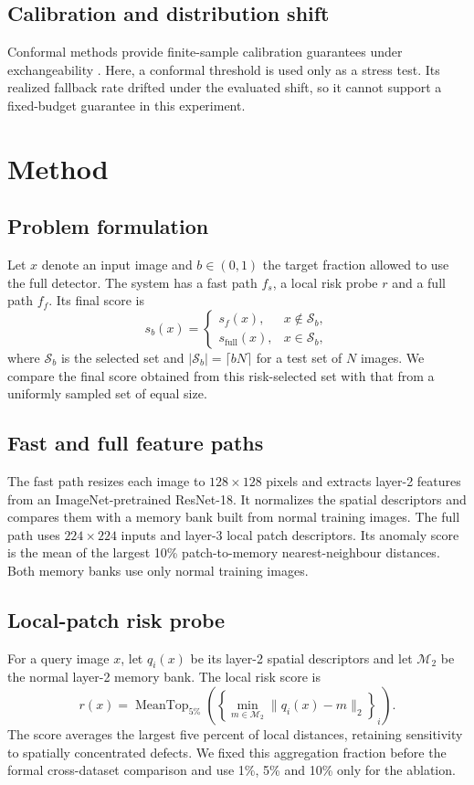 \documentclass[iicol,pdflatex,sn-basic,Numbered]{sn-jnl}
\begin{document}
\subsection{Calibration and distribution shift}
Conformal methods provide finite-sample calibration guarantees under exchangeability \cite{vovk2005algorithmic,angelopoulos2023conformal}. Here, a conformal threshold is used only as a stress test. Its realized fallback rate drifted under the evaluated shift, so it cannot support a fixed-budget guarantee in this experiment.

\section{Method}\label{sec:method}

\subsection{Problem formulation}
Let $x$ denote an input image and $b\in(0,1)$ the target fraction allowed to use the full detector. The system has a fast path $f_s$, a local risk probe $r$ and a full path $f_f$. Its final score is
\begin{equation}
s_b(x)=\begin{cases}
s_f(x), & x\notin\mathcal{S}_b,\\
s_{\mathrm{full}}(x), & x\in\mathcal{S}_b,
\end{cases}
\end{equation}
where $\mathcal{S}_b$ is the selected set and $|\mathcal{S}_b|=\lceil bN\rceil$ for a test set of $N$ images. We compare the final score obtained from this risk-selected set with that from a uniformly sampled set of equal size.

\subsection{Fast and full feature paths}
The fast path resizes each image to $128\times128$ pixels and extracts layer-2 features from an ImageNet-pretrained ResNet-18. It normalizes the spatial descriptors and compares them with a memory bank built from normal training images. The full path uses $224\times224$ inputs and layer-3 local patch descriptors. Its anomaly score is the mean of the largest 10\% patch-to-memory nearest-neighbour distances. Both memory banks use only normal training images.

\subsection{Local-patch risk probe}
For a query image $x$, let $q_i(x)$ be its layer-2 spatial descriptors and let $\mathcal{M}_2$ be the normal layer-2 memory bank. The local risk score is
\begin{equation}
r(x)=\operatorname{MeanTop}_{5\%}\left(\left\{\min_{m\in\mathcal{M}_2}\lVert q_i(x)-m\rVert_2\right\}_i\right).
\end{equation}
The score averages the largest five percent of local distances, retaining sensitivity to spatially concentrated defects. We fixed this aggregation fraction before the formal cross-dataset comparison and use 1\%, 5\% and 10\% only for the ablation.
\end{document}
